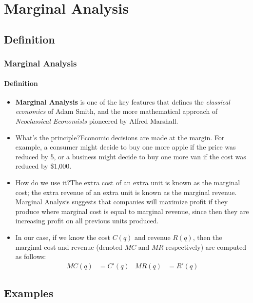 \documentclass[9pt,xcolor=x11names,compress]{beamer}
\begin{document}
\section{Marginal Analysis}
\subsection{Definition}

\begin{frame}\frametitle{Marginal Analysis}
\framesubtitle{Definition}
\begin{itemize}[<+->]
\item \textbf{Marginal Analysis} is one of the key features that defines the \emph{classical economics} of \alert{Adam Smith}, and the more mathematical approach of \emph{Neoclassical Economists} pioneered by \alert{Alfred Marshall}.
\item \alert{What's the principle?}\newline Economic decisions are made at the margin.  For example, a consumer might decide to buy one more apple if the price was reduced by 5\cent, or a business might decide to buy one more van if the cost was reduced by \$1,000. 
\item \alert{How do we use it?}\newline The extra cost of an extra unit is known as the \alert{marginal cost}; the extra revenue of an extra unit is known as the \alert{marginal revenue}. Marginal Analysis suggests that companies will maximize profit if they produce where marginal cost is equal to marginal revenue, since then they are increasing profit on all previous units produced.
\item In our case, if we know the \alert{cost} $C(q)$ and \alert{revenue} $R(q)$, then the marginal cost and revenue (denoted $MC$ and $MR$ respectively) are computed as follows:
\begin{align*}
	MC(q)&=C'(q) &MR(q)&=R'(q)
\end{align*}
\end{itemize}
\end{frame}

\subsection{Examples}
\end{document}
